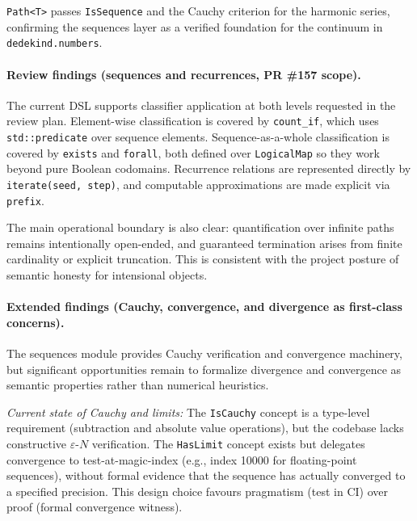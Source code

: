\documentclass[11pt, a4paper]{report}
\begin{document}
\texttt{Path<T>} passes \texttt{IsSequence} and the Cauchy criterion for the harmonic series, confirming the sequences layer as a verified foundation for the continuum in \texttt{dedekind.numbers}.

\paragraph{Review findings (sequences and recurrences, PR \#157 scope).}
The current DSL supports classifier application at both levels requested in the review plan.
Element-wise classification is covered by \texttt{count\_if}, which uses \texttt{std::predicate} over sequence elements.
Sequence-as-a-whole classification is covered by \texttt{exists} and \texttt{forall}, both defined over \texttt{LogicalMap} so they work beyond pure Boolean codomains.
Recurrence relations are represented directly by \texttt{iterate(seed, step)}, and computable approximations are made explicit via \texttt{prefix}.

The main operational boundary is also clear: quantification over infinite paths remains intentionally open-ended, and guaranteed termination arises from finite cardinality or explicit truncation.
This is consistent with the project posture of semantic honesty for intensional objects.

\paragraph{Extended findings (Cauchy, convergence, and divergence as first-class concerns).}
The sequences module provides Cauchy verification and convergence machinery, but significant opportunities remain to formalize divergence and convergence as semantic properties rather than numerical heuristics.

\textit{Current state of Cauchy and limits:} The \texttt{IsCauchy} concept is a type-level requirement (subtraction and absolute value operations), but the codebase lacks constructive $\varepsilon$-$N$ verification. The \texttt{HasLimit} concept exists but delegates convergence to test-at-magic-index (e.g., index 10000 for floating-point sequences), without formal evidence that the sequence has actually converged to a specified precision. This design choice favours pragmatism (test in CI) over proof (formal convergence witness).
\end{document}
